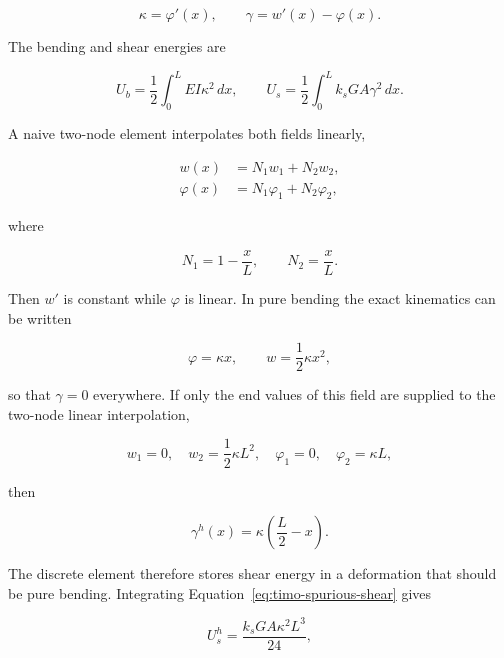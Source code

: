 \begin{equation}
    \kappa=\varphi'(x),
    \qquad
    \gamma=w'(x)-\varphi(x).
\end{equation}

The bending and shear energies are

\begin{equation}
    U_b=\frac{1}{2}\int_0^LEI\kappa^2\,dx,
    \qquad
    U_s=\frac{1}{2}\int_0^Lk_sGA\gamma^2\,dx.
\end{equation}

A naive two-node element interpolates both fields linearly,

\begin{align}
    w(x)&=N_1w_1+N_2w_2,\\
    \varphi(x)&=N_1\varphi_1+N_2\varphi_2,
\end{align}

where

\begin{equation}
    N_1=1-\frac{x}{L},\qquad N_2=\frac{x}{L}.
\end{equation}

Then $w'$ is constant while $\varphi$ is linear. In pure bending the exact
kinematics can be written

\begin{equation}
    \varphi=\kappa x,
    \qquad
    w=\frac{1}{2}\kappa x^2,
\end{equation}

so that $\gamma=0$ everywhere. If only the end values of this field are supplied
to the two-node linear interpolation,

\begin{equation}
    w_1=0,
    \quad
    w_2=\frac{1}{2}\kappa L^2,
    \quad
    \varphi_1=0,
    \quad
    \varphi_2=\kappa L,
\end{equation}

then

\begin{equation}\label{eq:timo-spurious-shear}
    \boxed{
    \gamma^h(x)=\kappa\left(\frac{L}{2}-x\right)
    }.
\end{equation}

The discrete element therefore stores shear energy in a deformation that should
be pure bending. Integrating Equation~\eqref{eq:timo-spurious-shear} gives

\begin{equation}
    U_s^h
    =\frac{k_sGA\kappa^2L^3}{24},
\end{equation}

